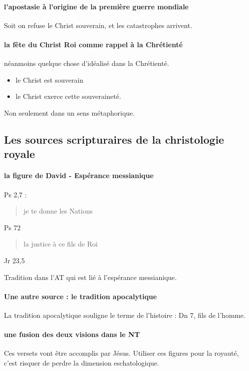 \paragraph{l'apostasie à l'origine de la première guerre mondiale} Soit on refuse le Christ souverain, et les catastrophes arrivent.

\paragraph{la fête du Christ Roi comme rappel à la Chrétienté} néanmoins quelque chose d'idéalisé dans la Chrétienté.

\begin{itemize}
    \item le Christ est souverain
\item le Christ exerce cette souveraineté.
\end{itemize}

Non seulement dans un sens métaphorique.

\subsection{Les sources scripturaires de la christologie royale }

\paragraph{la figure de David - Espérance messianique} Ps 2,7 :
\begin{quote}
    je te donne les Nations
\end{quote}
Ps 72
\begin{quote}
    la justice à ce fils de Roi 
\end{quote}
Jr 23,5

Tradition dans l'AT qui est lié à l'espérance messianique.

\paragraph{Une autre source : le tradition apocalytique} La tradition apocalytique souligne le terme de l'histoire : Dn 7, fils de l'homme.

\paragraph{une fusion des deux visions dans le NT} Ces versets vont être accomplis par Jésus. Utiliser ces figures pour la royauté, c'est risquer de perdre la dimension eschatologique.

